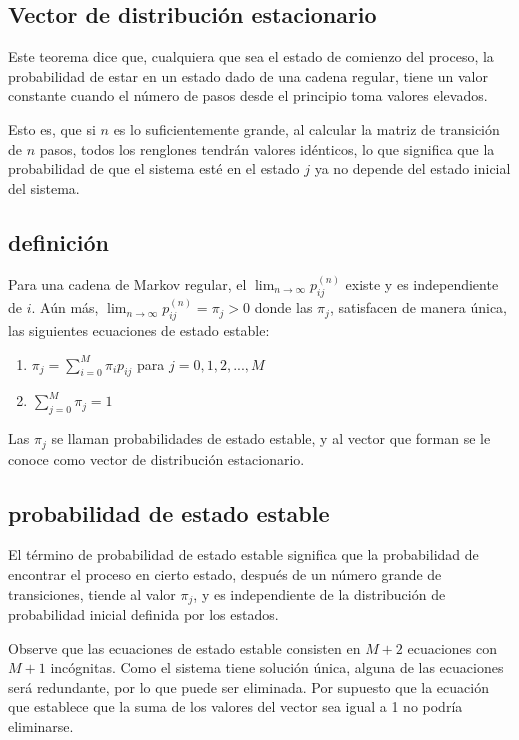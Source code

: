 \documentclass{article}
\begin{document}
\subsection*{Vector de distribución estacionario}

Este teorema dice que, cualquiera que sea el estado de comienzo del proceso, la probabilidad de estar en un estado dado de una cadena regular, tiene un valor constante cuando el número de pasos desde el principio toma valores elevados.

Esto es, que si \( n \) es lo suficientemente grande, al calcular la matriz de transición de \( n \) pasos, todos los renglones tendrán valores idénticos, lo que significa que la probabilidad de que el sistema esté en el estado \( j \) ya no depende del estado inicial del sistema.

\subsection*{definición}

Para una cadena de Markov regular, el \(\lim_{n \to \infty} p_{ij}^{(n)}\) existe y es independiente de \(i\). Aún más, \(\lim_{n \to \infty} p_{ij}^{(n)} = \pi_j > 0\) donde las \(\pi_j\), satisfacen de manera única, las siguientes ecuaciones de estado estable:

\begin{enumerate}
    \item \(\pi_j = \sum_{i=0}^{M} \pi_i p_{ij}\) para \(j=0,1,2,...,M\)
    \item \(\sum_{j=0}^{M} \pi_j = 1\)
\end{enumerate}

Las \(\pi_j\) se llaman probabilidades de estado estable, y al vector que forman se le conoce como vector de distribución estacionario.

\subsection*{probabilidad de estado estable}

El término de probabilidad de estado estable significa que la probabilidad de encontrar el proceso en cierto estado, después de un número grande de transiciones, tiende al valor \(\pi_j\), y es independiente de la distribución de probabilidad inicial definida por los estados.

Observe que las ecuaciones de estado estable consisten en \( M+2 \) ecuaciones con \( M+1 \) incógnitas. Como el sistema tiene solución única, alguna de las ecuaciones será redundante, por lo que puede ser eliminada. Por supuesto que la ecuación que establece que la suma de los valores del vector sea igual a 1 no podría eliminarse.
\end{document}
